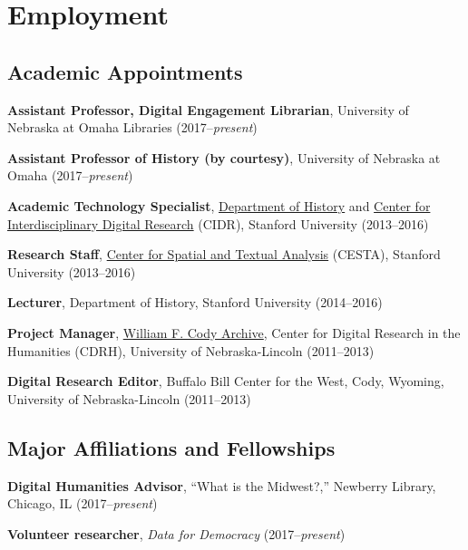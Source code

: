 \section{Employment}\label{employment}

\subsection{Academic Appointments}\label{academic-appointments}

\textbf{Assistant Professor, Digital Engagement Librarian}, University
of Nebraska at Omaha Libraries (2017--\emph{present})

\textbf{Assistant Professor of History (by courtesy)}, University of
Nebraska at Omaha (2017--\emph{present})

\vspace{.4cm}

\textbf{Academic Technology Specialist},
\href{http://history.stanford.edu}{Department of History} and
\href{http://cidr.stanford.edu}{Center for Interdisciplinary Digital
Research} (CIDR), Stanford University (2013--2016)

\textbf{Research Staff}, \href{http://cesta.stanford.edu}{Center for
Spatial and Textual Analysis} (CESTA), Stanford University (2013--2016)

\textbf{Lecturer}, Department of History, Stanford University
(2014--2016)

\vspace{.4cm}

\textbf{Project Manager}, \href{http://codyarchive.org}{William F. Cody
Archive}, Center for Digital Research in the Humanities (CDRH),
University of Nebraska-Lincoln (2011--2013)

\textbf{Digital Research Editor}, Buffalo Bill Center for the West,
Cody, Wyoming, University of Nebraska-Lincoln (2011--2013)

\vspace{0.2cm}

\subsection{Major Affiliations and
Fellowships}\label{major-affiliations-and-fellowships}

\textbf{Digital Humanities Advisor}, ``What is the Midwest?,'' Newberry
Library, Chicago, IL (2017--\emph{present})

\textbf{Volunteer researcher}, \emph{Data for Democracy}
(2017--\emph{present})

